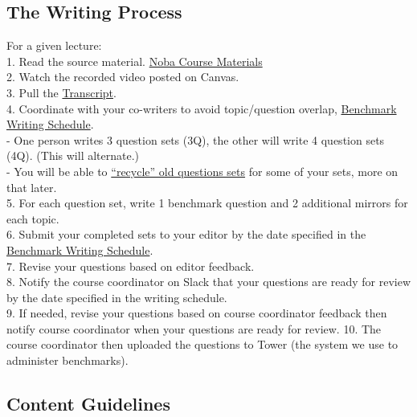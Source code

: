 \documentclass[
]{article}
\begin{document}
\hypertarget{the-writing-process}{%
\subsection{The Writing Process}\label{the-writing-process}}

For a given lecture:\\
1. Read the source material. \href{https://drive.google.com/drive/folders/16iWL0kLyEOdUv9yKJN0-ujgFE7A_gHMH?usp=drive_link}{Noba Course Materials}\\
2. Watch the recorded video posted on Canvas.\\
3. Pull the \href{https://utexas.app.box.com/folder/301841199745?s=h9lcrvgqmm9zi43g8qo8ctfzcz4yq7wt}{Transcript}.\\
4. Coordinate with your co-writers to avoid topic/question overlap, \href{https://docs.google.com/spreadsheets/d/1N9WRwAjtkOxEvx-edf1KLUiHobvfGxEd/edit?gid=602524248\#gid=602524248}{Benchmark Writing Schedule}.\\
- One person writes 3 question sets (3Q), the other will write 4 question sets (4Q). (This will alternate.)\\
- You will be able to \protect\hyperlink{recycling-benchmark-questions}{``recycle'' old questions sets} for some of your sets, more on that later.\\
5. For each question set, write 1 benchmark question and 2 additional mirrors for each topic.\\
6. Submit your completed sets to your editor by the date specified in the \href{https://docs.google.com/spreadsheets/d/1N9WRwAjtkOxEvx-edf1KLUiHobvfGxEd/edit?gid=602524248\#gid=602524248}{Benchmark Writing Schedule}.\\
7. Revise your questions based on editor feedback.\\
8. Notify the course coordinator on Slack that your questions are ready for review by the date specified in the writing schedule.\\
9. If needed, revise your questions based on course coordinator feedback then notify course coordinator when your questions are ready for review.
10. The course coordinator then uploaded the questions to Tower (the system we use to administer benchmarks).

\hypertarget{content-guidelines}{%
\subsection{Content Guidelines}\label{content-guidelines}}
\end{document}
